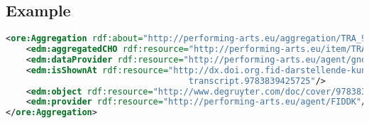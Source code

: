 \documentclass[12pt, a4paper, margin=2in]{report}
\begin{document}
\subsection*{Example}
\begin{lstlisting}[language=XML]
<ore:Aggregation rdf:about="http://performing-arts.eu/aggregation/TRA_9783839425725">
    <edm:aggregatedCHO rdf:resource="http://performing-arts.eu/item/TRA_9783839425725"/>
    <edm:dataProvider rdf:resource="http://performing-arts.eu/agent/gnd/1058035266"/>
    <edm:isShownAt rdf:resource="http://dx.doi.org.fid-darstellende-kunst.idm.oclc.org/10.14361/
                                    transcript.9783839425725"/>
    <edm:object rdf:resource="http://www.degruyter.com/doc/cover/9783839425725.jpg"/>
    <edm:provider rdf:resource="http://performing-arts.eu/agent/FIDDK"/>
</ore:Aggregation>
\end{lstlisting}
\end{document}
